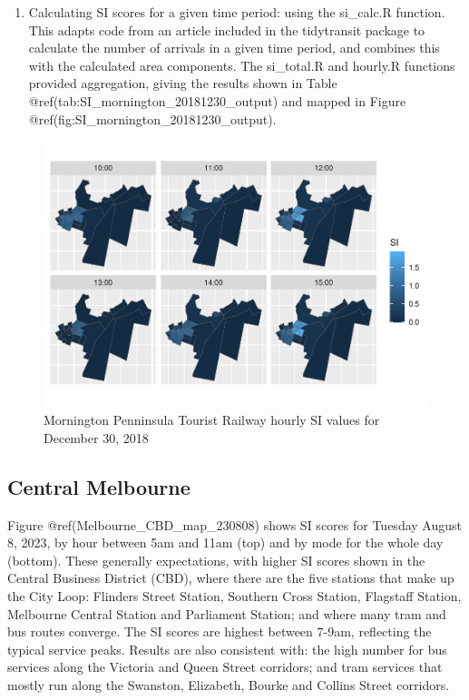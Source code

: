 \documentclass[preprint, 3p,
authoryear]{elsarticle} %
\providecommand{\tightlist}{%
  \setlength{\itemsep}{0pt}\setlength{\parskip}{0pt}}
\begin{document}
\begin{enumerate}
\def\labelenumi{(\arabic{enumi})}
\setcounter{enumi}{3}
\tightlist
\item
  Calculating SI scores for a given time period: using the si\_calc.R
  function. This adapts code from an article included in the tidytransit
  package \citep{tidytransit_departure_timetable} to calculate the
  number of arrivals in a given time period, and combines this with the
  calculated area components. The si\_total.R and hourly.R functions
  provided aggregation, giving the results shown in Table
  @ref(tab:SI\_mornington\_20181230\_output) and mapped in Figure
  @ref(fig:SI\_mornington\_20181230\_output).
\end{enumerate}

\begin{figure}
\centering
\includegraphics{Leveraging_GTFS_to_assess_transit_supply_Transport_Geography_files/figure-latex/SI_mornington_20181230_output-1.pdf}
\caption{Mornington Penninsula Tourist Railway hourly SI values for
December 30, 2018}
\end{figure}

\hypertarget{central-melbourne}{%
\subsection{Central Melbourne}\label{central-melbourne}}

Figure @ref(Melbourne\_CBD\_map\_230808) shows SI scores for Tuesday
August 8, 2023, by hour between 5am and 11am (top) and by mode for the
whole day (bottom). These generally expectations, with higher SI scores
shown in the Central Business District (CBD), where there are the five
stations that make up the City Loop: Flinders Street Station, Southern
Cross Station, Flagstaff Station, Melbourne Central Station and
Parliament Station; and where many tram and bus routes converge. The SI
scores are highest between 7-9am, reflecting the typical service peaks.
Results are also consistent with: the high number for bus services along
the Victoria and Queen Street corridors; and tram services that mostly
run along the Swanston, Elizabeth, Bourke and Collins Street corridors.
\end{document}
